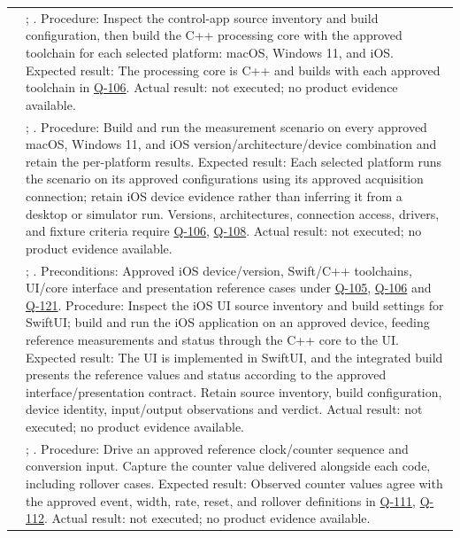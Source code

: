 \begin{tabularx}{\linewidth}{L{2cm}Y}
 & ; . Procedure: Inspect the control-app source inventory and build configuration, then build the C++ processing core with the approved toolchain for each selected platform: macOS, Windows 11, and iOS. Expected result: The processing core is C++ and builds with each approved toolchain in \hyperref[Question:Q-106]{Q-106}. Actual result: not executed; no product evidence available.\\
 & ; . Procedure: Build and run the measurement scenario on every approved macOS, Windows 11, and iOS version/architecture/device combination and retain the per-platform results. Expected result: Each selected platform runs the scenario on its approved configurations using its approved acquisition connection; retain iOS device evidence rather than inferring it from a desktop or simulator run. Versions, architectures, connection access, drivers, and fixture criteria require \hyperref[Question:Q-106]{Q-106}, \hyperref[Question:Q-108]{Q-108}. Actual result: not executed; no product evidence available.\\
 & ; . Preconditions: Approved iOS device/version, Swift/C++ toolchains, UI/core interface and presentation reference cases under \hyperref[Question:Q-105]{Q-105}, \hyperref[Question:Q-106]{Q-106} and \hyperref[Question:Q-121]{Q-121}. Procedure: Inspect the iOS UI source inventory and build settings for SwiftUI; build and run the iOS application on an approved device, feeding reference measurements and status through the C++ core to the UI. Expected result: The UI is implemented in SwiftUI, and the integrated build presents the reference values and status according to the approved interface/presentation contract. Retain source inventory, build configuration, device identity, input/output observations and verdict. Actual result: not executed; no product evidence available.\\
 & ; . Procedure: Drive an approved reference clock/counter sequence and conversion input. Capture the counter value delivered alongside each code, including rollover cases. Expected result: Observed counter values agree with the approved event, width, rate, reset, and rollover definitions in \hyperref[Question:Q-111]{Q-111}, \hyperref[Question:Q-112]{Q-112}. Actual result: not executed; no product evidence available.\\

\end{tabularx}
